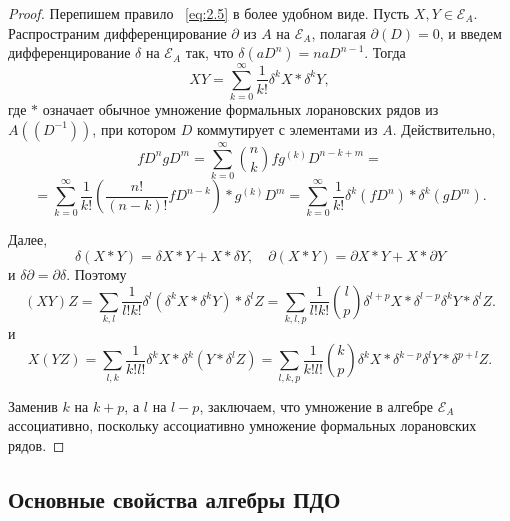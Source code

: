 \documentclass{article}
\theoremstyle{definition}
\theoremstyle{definition} %
\theoremstyle{remark}     %
\theoremstyle{definition}
\theoremstyle{definition}
\theoremstyle{definition}
\theoremstyle{definition}
\theoremstyle{definition}
\theoremstyle{definition}
\theoremstyle{definition}
\theoremstyle{definition}
\begin{document}
\begin{proof} Перепишем правило ~\ref{eq:2.5} в более удобном виде. Пусть \( X, Y \in \mathcal{E}_A \). Распространим дифференцирование \( \partial \) из \( A \) на \( \mathcal{E}_A \), полагая \( \partial(D) = 0 \), и введем дифференцирование \( \delta \) на \( \mathcal{E}_A \) так, что \( \delta(aD^n) = naD^{n-1} \). Тогда
\[
XY = \sum_{k=0}^\infty \frac{1}{k!} \delta^k X * \delta^k Y,
\]
где \( * \) означает обычное умножение формальных лорановских рядов из \( A((D^{-1})) \), при котором \( D \) коммутирует с элементами из \( A \). Действительно,
\[
f D^n g D^m = \sum_{k=0}^\infty \binom{n}{k} f g^{(k)} D^{n-k+m} =
\]
\[
= \sum_{k=0}^\infty \frac{1}{k!} \left( \frac{n!}{(n-k)!} f D^{n-k} \right) * g^{(k)} D^m = \sum_{k=0}^\infty \frac{1}{k!} \delta^k (f D^n) * \delta^k (g D^m).
\]

Далее,
\[
\delta(X * Y) = \delta X * Y + X * \delta Y, \quad \partial(X * Y) = \partial X * Y + X * \partial Y
\]
и \( \delta \partial = \partial \delta \). Поэтому
\[
(XY) Z = \sum_{k,l} \frac{1}{l!k!} \delta^l (\delta^k X * \delta^k Y) * \delta^l Z = \sum_{k,l,p} \frac{1}{l!k!} \binom{l}{p} \delta^{l+p} X * \delta^{l-p} \delta^k Y * \delta^l Z.
\]
и
\[
X(YZ) = \sum_{l,k} \frac{1}{k!l!} \delta^k X * \delta^k (Y * \delta^l Z) = \sum_{l,k,p} \frac{1}{k!l!} \binom{k}{p} \delta^k X * \delta^{k-p} \delta^l Y * \delta^{p+l} Z.
\]

Заменив \( k \) на \( k + p \), а \( l \) на \( l - p \), заключаем, что умножение в алгебре \( \mathcal{E}_A \) ассоциативно, поскольку ассоциативно умножение формальных лорановских рядов.

\end{proof}




\subsection{Основные свойства алгебры ПДО}
\end{document}

